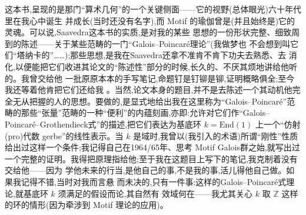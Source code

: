 \pmark{}这本书,呈现的是那门“算术几何”的一个关键侧面——它的视野(总体眼光)六十年代里在我心中诞生
并成长(当时还没有名字),而 Motif 的瑜伽曾是(并且始终是)它的灵魂。可以说,Saavedra这本书的实质,是对我的某些
思想的一份形状完整、细致周到的陈述——关于某些范畴的一门“Galois--Poincaré理论”(我做梦也
不会想到叫它们“塔纳卡的”……);那些思想,是我在Saavedra还拿不准肯不肯下功夫去熟悉、去
消化,以便能把它们收进其论文的“陈述性”部分的时候,长久的、不厌其烦地讲给他听的。我曾交给他
一批原原本本的手写笔记,命题钉是钉铆是铆,证明概略俱全;至今我还等着他肯把它们还给我
。当然,论文本身的题目,并不是去陈述一个其动机他完
全无从把握的人的思想。要做的,是显式地给出我在这里称为“Galois--Poincaré”范畴的那些“张量”范畴的一种“便利”的内蕴刻画,亦即:允许对它们作“Galois--Poincaré--Grothendieck式”的描述,把它们表达为基底环 $k=\mathrm{End}(1)$ 上一个“仿射(pro)代数 gerbe”的线性表示。当 $k$ 是域时,我曾以(我引入的术语)所谓“刚性”性质给出过这样一个条件;我记得自己在1964/65年、思考 Motif Galois群之始,就写出过一个完整的证明\dmark{}。我得把原理指给他;至于我在这题目上写下的笔记,我克制着没有交给他——因为
学他未来的行当,是他自己的事,不是我的事,活儿得他自己做。如果我记得不错,当时对我而言悬
而未决的,只有一件事:这样的Galois--Poincaré式理论,就基底环 $k$ 须满足的假设而论,其自然有
效域何在——我尤其关心 $k$ 取 $\mathbb{Z}$ 这样的环的情形(因为牵涉到 Motif 理论的应用)。

